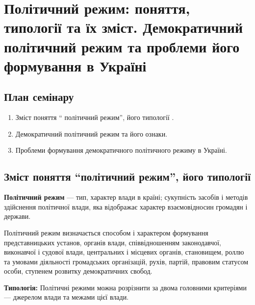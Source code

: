 \section{Політичний режим: поняття, типології та їх зміст. Демократичний політичний режим  та  проблеми його формування  в Україні}
\subsection{План семінару}
\begin{enumerate}
\item Зміст поняття “ політичний режим”,  його типології .
\item Демократичний  політичний режим та його ознаки.
\item Проблеми формування демократичного політичного режиму в Україні.
\end{enumerate}

\subsection{Зміст поняття “політичний режим”, його типології}
\textbf{Політичний режим} — тип, характер влади в країні; сукупність засобів і методів здійснення політичної влади, яка відображає характер взаємовідносин громадян і держави.

Політичний режим визначається способом і характером формування представницьких установ, органів влади, співвідношенням законодавчої, виконавчої і судової влади, центральних і місцевих органів, становищем, роллю та умовами діяльності громадських організацій, рухів, партій, правовим статусом особи, ступенем розвитку демократичних свобод.

\noindent\textbf{Типологія:}
Політичні режими можна розрізнити за двома головними критеріями — джерелом влади та межами цієї влади.

